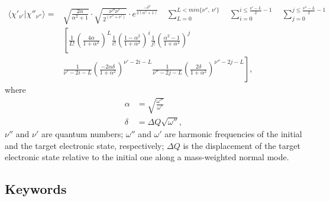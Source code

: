 \documentclass[11pt]{article}
\begin{document}
\begin{align}
\langle\chi'_{\nu'} |\chi''_{\nu''}\rangle = &
\sqrt{\frac{2\alpha}{\alpha^2+1}}
\cdot
\sqrt{\frac{\nu''\nu'}{2^{(\nu''+\nu')}}}
\cdot
e^{\frac{-\delta^2}{2(\alpha^2+1)}} 
\quad
\sum_{L=0}^{L<min\{\nu'',\:\nu'\}} 
\quad
\sum_{i=0}^{i\le\frac{\nu'-L}{2}-1} 
\quad
\sum_{j=0}^{j\le\frac{\nu''-L}{2}-1}  \nonumber \\ 
&\left[\frac{1}{L!}\left(\frac{4\alpha}{1+\alpha^2}\right)^L
\frac{1}{i!}\left(\frac{1-\alpha^2}{1+\alpha^2}\right)^i
\frac{1}{j!}\left(\frac{\alpha^2-1}{1+\alpha^2}\right)^j \right. \nonumber\\
&\left.
\frac{1}{\nu'-2i-L}
\left(\frac{-2\alpha\delta}{1+\alpha^2}\right)^{\nu'-2i-L}
\frac{1}{\nu''-2j-L}
\left(\frac{2\delta}{1+\alpha^2}\right)^{\nu''-2j-L}\right],
\end{align}
where
\begin{align}
\alpha&=\sqrt{\frac{\omega''}{\omega'}}\nonumber\\
\delta&=\Delta Q\sqrt{\omega''},
\end{align}
$\nu''$ and $\nu'$ are quantum numbers; $\omega''$ and $\omega'$ are harmonic frequencies of the initial and the target 
electronic state, respectively; $\Delta Q$ is the displacement of the target electronic state relative to the initial one
along a mass-weighted normal mode.

\subsection{Keywords}
\label{sec:para:keywords}
\end{document}
